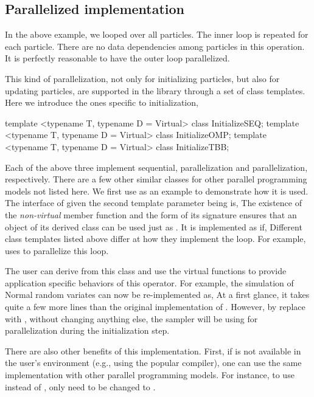 \subsection{Parallelized implementation}
\label{sub:Parallelized implementation}

In the above example, we looped over all particles. The inner loop is repeated
for each particle. There are no data dependencies among particles in this
operation. It is perfectly reasonable to have the outer loop parallelized.

This kind of parallelization, not only for initializing particles, but also
for updating particles, are supported in the \vsmc library through a set of
class templates. Here we introduce the ones specific to initialization,
\begin{cppcode}
template <typename T, typename D = Virtual> class InitializeSEQ;
template <typename T, typename D = Virtual> class InitializeOMP;
template <typename T, typename D = Virtual> class InitializeTBB;
\end{cppcode}
Each of the above three implement sequential, \openmp parallelization and \tbb
parallelization, respectively. There are a few other similar classes for other
parallel programming models not listed here. We first use
 as an example to demonstrate how it is used. The
interface of  given the second template parameter
being  is,
The existence of the \emph{non-virtual} member function 
and the form of its signature ensures that an object of its derived class can
be used just as . It is implemented as if,
Different class templates listed above differ at how they implement the loop.
For example,  uses \openmp to parallelize this loop.

The user can derive from this class and use the virtual functions to provide
application specific behaviors of this operator. For example, the simulation
of Normal random variates can now be re-implemented as,
At a first glance, it takes quite a few more lines than the original
implementation of . However, by replace
 with , without changing
anything else, the sampler will be using \openmp for parallelization during
the initialization step.

There are also other benefits of this implementation. First, if \openmp is not
available in the user's \cpp environment (e.g., using the popular \clang
\cite{clang} compiler), one can use the same implementation with other
parallel programming models. For instance, to use \tbb instead of \openmp,
only  need to be changed to
.

